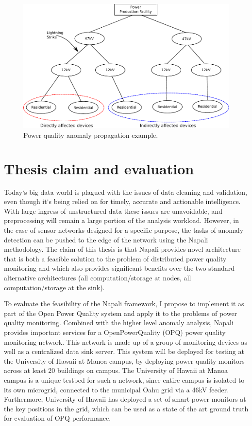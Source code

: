 \begin{figure}[h]
	\centering
	  \includegraphics[width=0.9\linewidth]{img/grid_hierarchy_cartoon.pdf}
	  \caption{Power quality anomaly propagation example.}
	  \label{intro:fig2}
\end{figure}

\section{Thesis claim and evaluation} \label{intro:sec:claim}

Today`s big data world is plagued with the issues of data cleaning and validation, even though it`s being relied on for timely, accurate and actionable intelligence. With large ingress of unstructured data these issues are unavoidable, and preprocessing will remain a large portion of the analysis workload. However, in the case of sensor networks designed for a specific purpose, the tasks of anomaly detection can be pushed to the edge of the network using the Napali methodology. The claim of this thesis is that Napali provides novel architecture that is both a feasible solution to the problem of distributed power quality monitoring and which also provides significant benefits over the two standard alternative architectures (all computation/storage at nodes, all computation/storage at the sink).

To evaluate the feasibility of the Napali framework, I propose to implement it as part of the Open Power Quality system and apply it to the problems of power quality monitoring. Combined with the higher level anomaly analysis, Napali provides important services for a OpenPowerQuality (OPQ) power quality monitoring network. This network is made up of a group of monitoring devices as well as a centralized data sink server. This system will be deployed for testing at the University of Hawaii at Manoa campus, by deploying power quality monitors across at least 20 buildings on campus. The University of Hawaii at Manoa campus is a unique testbed for such a network, since entire campus is isolated to its own microgrid, connected to the municipal Oahu grid via a 46kV feeder. Furthermore, University of Hawaii has deployed a set of smart power monitors at the key positions in the grid, which can be used as a state of the art ground truth for evaluation of OPQ performance. 


